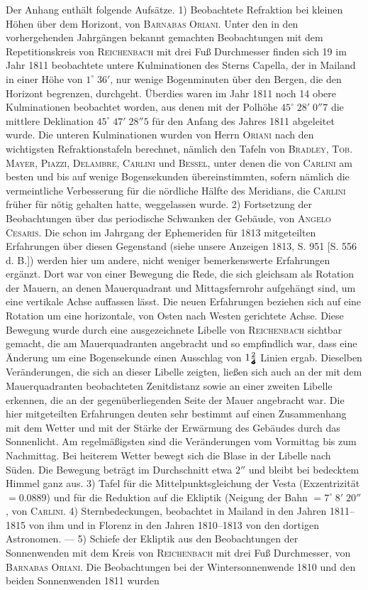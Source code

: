 Der Anhang enthält folgende Aufsätze. 1) Beobachtete Refraktion bei kleinen Höhen über dem Horizont, von \textsc{Barnabas Oriani}. Unter den in den vorhergehenden Jahrgängen bekannt gemachten Beobachtungen mit dem Repetitionskreis von \textsc{Reichenbach} mit drei Fuß Durchmesser finden sich 19 im Jahr 1811 beobachtete untere Kulminationen des Sterns Capella, der in Mailand in einer Höhe von $1^\circ\;36'$, nur wenige Bogenminuten über den Bergen, die den Horizont begrenzen, durchgeht. Überdies waren im Jahr 1811 noch 14 obere Kulminationen beobachtet worden, aus denen mit der Polhöhe $45^\circ\;28'\;0''7$ die mittlere Deklination $45^\circ\;47'\;28''5$ für den Anfang des Jahres 1811 abgeleitet wurde. Die unteren Kulminationen wurden von Herrn \textsc{Oriani} nach den wichtigsten Refraktionstafeln berechnet, nämlich den Tafeln von \textsc{Bradley}, \textsc{Tob. Mayer}, \textsc{Piazzi}, \textsc{Delambre}, \textsc{Carlini} und \textsc{Bessel}, unter denen die von \textsc{Carlini} am besten und bis auf wenige Bogensekunden übereinstimmten, sofern nämlich die vermeintliche Verbesserung für die nördliche Hälfte des Meridians, die \textsc{Carlini} früher für nötig gehalten hatte, weggelassen wurde. 2) Fortsetzung der Beobachtungen über das periodische Schwanken der Gebäude, von \textsc{Angelo Cesaris}. Die schon im Jahrgang der Ephemeriden für 1813 mitgeteilten Erfahrungen über diesen Gegenstand (siehe unsere Anzeigen 1813, S. 951 [S. 556 d. B.]) werden hier um andere, nicht weniger bemerkenswerte Erfahrungen ergänzt. Dort war von einer Bewegung die Rede, die sich gleichsam als Rotation der Mauern, an denen Mauerquadrant und Mittagsfernrohr aufgehängt sind, um eine vertikale Achse auffassen lässt. Die neuen Erfahrungen beziehen sich auf eine Rotation um eine horizontale, von Osten nach Westen gerichtete Achse. Diese Bewegung wurde durch eine ausgezeichnete Libelle von \textsc{Reichenbach} sichtbar gemacht, die am Mauerquadranten angebracht und so empfindlich war, dass eine Änderung um eine Bogensekunde einen Ausschlag von $1\frac{2}{\ObservedLibelleDenominator}$ Linien ergab. Dieselben Veränderungen, die sich an dieser Libelle zeigten, ließen sich auch an der mit dem Mauerquadranten beobachteten Zenitdistanz sowie an einer zweiten Libelle erkennen, die an der gegenüberliegenden Seite der Mauer angebracht war. Die hier mitgeteilten Erfahrungen deuten sehr bestimmt auf einen Zusammenhang mit dem Wetter und mit der Stärke der Erwärmung des Gebäudes durch das Sonnenlicht. Am regelmäßigsten sind die Veränderungen vom Vormittag bis zum Nachmittag. Bei heiterem Wetter bewegt sich die Blase in der Libelle nach Süden. Die Bewegung beträgt im Durchschnitt etwa $2''$ und bleibt bei bedecktem Himmel ganz aus. 3) Tafel für die Mittelpunktsgleichung der Vesta (Exzentrizität $=0.0889$) und für die Reduktion auf die Ekliptik (Neigung der Bahn $=7^\circ\;8'\;20''$, von \textsc{Carlini}. 4) Sternbedeckungen, beobachtet in Mailand in den Jahren 1811--1815 von ihm und in Florenz in den Jahren 1810--1813 von den dortigen Astronomen. --- 5) Schiefe der Ekliptik aus den Beobachtungen der Sonnenwenden mit dem Kreis von \textsc{Reichenbach} mit drei Fuß Durchmesser, von \textsc{Barnabas Oriani}. Die Beobachtungen bei der Wintersonnenwende 1810 und den beiden Sonnenwenden 1811 wurden 